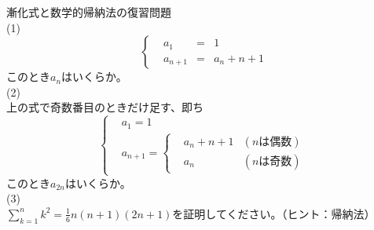 \documentclass[12pt,a4paper]{jsarticle}
\begin{document}
漸化式と数学的帰納法の復習問題\\
(1)\\
\begin{equation*}
    \left\{
      \begin{aligned}
      &a_1 &=&1  \\
      &a_{n+1} &=&a_n+n+1
      \end{aligned}
    \right.
\end{equation*}
このとき$a_n$はいくらか。\\
(2)\\
上の式で奇数番目のときだけ足す、即ち
\begin{equation*}
    \left\{
    \begin{split}
        &a_1=1\\
        &a_{n+1}=
        \left\{
        \begin{aligned}
            &a_n+n+1 &(nは偶数)\\
            &a_n &(nは奇数)
        \end{aligned}
        \right.
    \end{split}
    \right.
\end{equation*}
このとき$a_{2n}$はいくらか。\\
(3)\\
$\sum_{k=1}^{n}k^2=\frac{1}{6}n(n+1)(2n+1)$を証明してください。（ヒント：帰納法）
\end{document}
